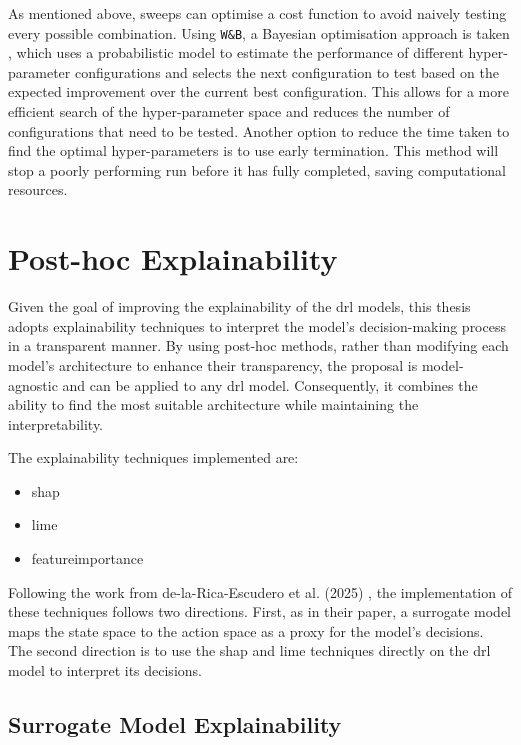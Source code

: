 As mentioned above, sweeps can optimise a cost function to avoid naively testing every possible combination. Using \texttt{W\&B}, a Bayesian optimisation approach is taken \cite{Falkner2018}, which uses a probabilistic model to estimate the performance of different hyper-parameter configurations and selects the next configuration to test based on the expected improvement over the current best configuration. This allows for a more efficient search of the hyper-parameter space and reduces the number of configurations that need to be tested. Another option to reduce the time taken to find the optimal hyper-parameters is to use early termination. This method will stop a poorly performing run before it has fully completed, saving computational resources.

\section{Post-hoc Explainability} \label{sec:post_hoc_explainability}

Given the goal of improving the explainability of the \acrshort{drl} models, this thesis adopts explainability techniques to interpret the model's decision-making process in a transparent manner. By using post-hoc methods, rather than modifying each model's architecture to enhance their transparency, the proposal is model-agnostic and can be applied to any \acrshort{drl} model. Consequently, it combines the ability to find the most suitable architecture while maintaining the interpretability.

The explainability techniques implemented are: 
\begin{itemize}
    \item \acrfull{shap}
    \item \acrfull{lime}
    \item \Gls{featureimportance}
\end{itemize}

Following the work from de-la-Rica-Escudero et al. (2025) \cite{de-La-Rica-Escudero2025}, the implementation of these techniques follows two directions. First, as in their paper, a surrogate model maps the state space to the action space as a proxy for the model's decisions. The second direction is to use the \acrshort{shap} and \acrshort{lime} techniques directly on the \acrshort{drl} model to interpret its decisions.

\subsection{Surrogate Model Explainability} \label{subsec:surrogate_model_explainability}

